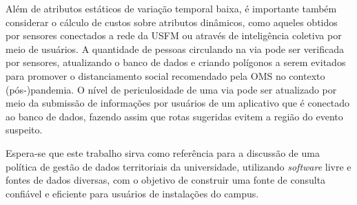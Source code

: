 \documentclass[oneside,openright,12pt]{ufsm_2015} %
\begin{document}
Além de atributos estáticos de variação temporal baixa, é importante também considerar o cálculo de custos sobre atributos dinâmicos, como aqueles obtidos por sensores conectados a rede da USFM ou através de inteligência coletiva por meio de usuários. A quantidade de pessoas circulando na via pode ser verificada por sensores, atualizando o banco de dados e criando polígonos a serem evitados para promover o distanciamento social recomendado pela OMS no contexto (pós-)pandemia. O nível de periculosidade de uma via pode ser atualizado por meio da submissão de informações por usuários de um  aplicativo que é conectado ao banco de dados, fazendo assim que rotas sugeridas evitem a região do evento suspeito.

Espera-se que este trabalho sirva como referência para a discussão de uma política de gestão de dados territoriais da universidade, utilizando \textit{software} livre e fontes de dados diversas, com o objetivo de construir uma fonte de consulta confiável e eficiente para usuários de instalações do campus.

	




\end{document}

